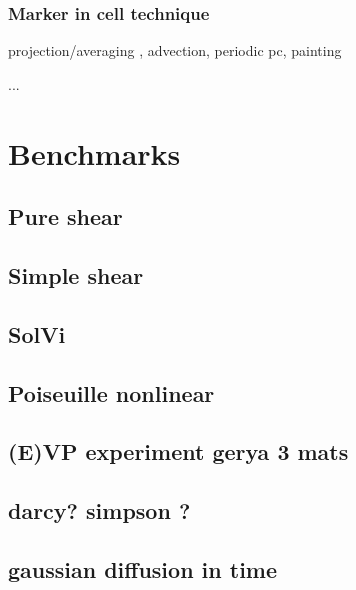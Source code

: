 \documentclass[a4paper]{article}
\begin{document}
\subsubsection{Marker in cell technique}

projection/averaging , advection, periodic pc, painting



...

\newpage
\section{Benchmarks}

\subsection{Pure shear}

\subsection{Simple shear}

\subsection{SolVi}

\subsection{Poiseuille nonlinear}

\subsection{(E)VP experiment gerya 3 mats}

\subsection{darcy? simpson ?}

\subsection{gaussian diffusion in time}






\newpage
\printbibliography
\end{document}
